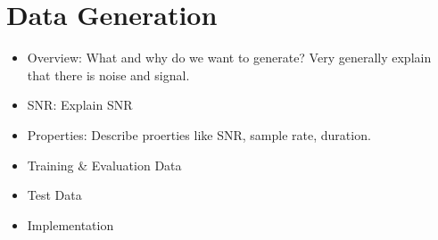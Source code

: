
\section{Data Generation}

\begin{itemize}
  \item Overview: What and why do we want to generate? Very generally explain
        that there is noise and signal.
  \item SNR: Explain SNR
  \item Properties: Describe proerties like SNR, sample rate, duration.
  \item Training \& Evaluation Data
  \item Test Data
  \item Implementation
\end{itemize}

